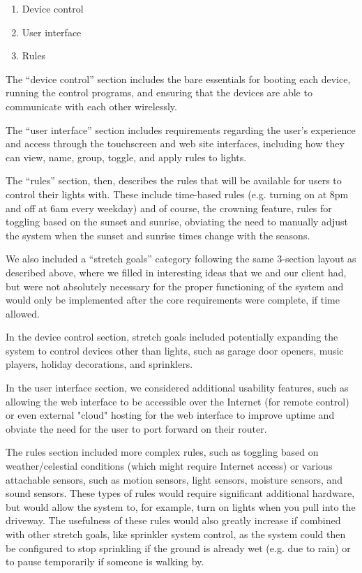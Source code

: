 \documentclass[letterpaper,10pt]{article}
\begin{document}
\begin{enumerate}
    \item Device control
    \item User interface
    \item Rules
\end{enumerate}

The ``device control'' section includes the bare essentials for booting each
device, running the control programs, and ensuring that the devices are able to
communicate with each other wirelessly.

The ``user interface'' section includes requirements regarding the user's
experience and access through the touchscreen and web site interfaces,
including how they can view, name, group, toggle, and apply rules to lights.

The ``rules'' section, then, describes the rules that will be available for
users to control their lights with.  These include time-based rules (e.g.
turning on at 8pm and off at 6am every weekday) and of course, the crowning
feature, rules for toggling based on the sunset and sunrise, obviating the need
to manually adjust the system when the sunset and sunrise times change with the
seasons.

We also included a ``stretch goals'' category following the same 3-section
layout as described above, where we filled in interesting ideas that we and our
client had, but were not absolutely necessary for the proper functioning of the
system and would only be implemented after the core requirements were complete,
if time allowed.

In the device control section, stretch goals included potentially expanding the
system to control devices other than lights, such as garage door openers, music
players, holiday decorations, and sprinklers.

In the user interface section, we considered additional usability features,
such as allowing the web interface to be accessible over the Internet (for
remote control) or even external "cloud" hosting for the web interface to
improve uptime and obviate the need for the user to port forward on their
router.

The rules section included more complex rules, such as toggling based on
weather/celestial conditions (which might require Internet access) or various
attachable sensors, such as motion sensors, light sensors, moisture sensors,
and sound sensors.  These types of rules would require significant additional
hardware, but would allow the system to, for example, turn on lights when you
pull into the driveway.  The usefulness of these rules would also greatly
increase if combined with other stretch goals, like sprinkler system control,
as the system could then be configured to stop sprinkling if the ground is
already wet (e.g. due to rain) or to pause temporarily if someone is walking
by.
\end{document}
